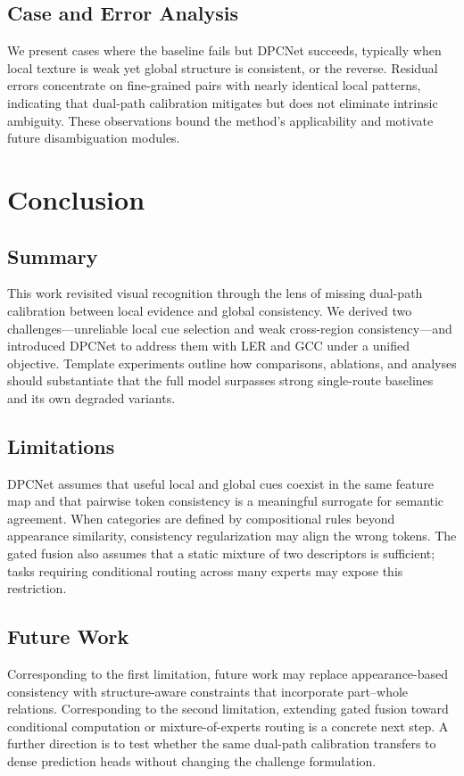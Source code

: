 \documentclass[11pt,a4paper]{article}
\begin{document}
\subsection{Case and Error Analysis}
\label{sec:error}
We present cases where the baseline fails but DPCNet succeeds, typically when local texture is weak yet global structure is consistent, or the reverse.
Residual errors concentrate on fine-grained pairs with nearly identical local patterns, indicating that dual-path calibration mitigates but does not eliminate intrinsic ambiguity.
These observations bound the method's applicability and motivate future disambiguation modules.

\section{Conclusion}
\label{sec:concl}

\subsection{Summary}
This work revisited visual recognition through the lens of missing dual-path calibration between local evidence and global consistency.
We derived two challenges---unreliable local cue selection and weak cross-region consistency---and introduced DPCNet to address them with LER and GCC under a unified objective.
Template experiments outline how comparisons, ablations, and analyses should substantiate that the full model surpasses strong single-route baselines and its own degraded variants.

\subsection{Limitations}
DPCNet assumes that useful local and global cues coexist in the same feature map and that pairwise token consistency is a meaningful surrogate for semantic agreement.
When categories are defined by compositional rules beyond appearance similarity, consistency regularization may align the wrong tokens.
The gated fusion also assumes that a static mixture of two descriptors is sufficient; tasks requiring conditional routing across many experts may expose this restriction.

\subsection{Future Work}
Corresponding to the first limitation, future work may replace appearance-based consistency with structure-aware constraints that incorporate part--whole relations.
Corresponding to the second limitation, extending gated fusion toward conditional computation or mixture-of-experts routing is a concrete next step.
A further direction is to test whether the same dual-path calibration transfers to dense prediction heads without changing the challenge formulation.



\end{document}
